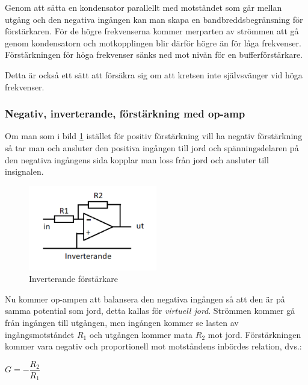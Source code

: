 Genom att sätta en kondensator parallellt med motståndet som går mellan utgång
och den negativa ingången kan man skapa en bandbreddsbegränsning för
förstärkaren.
För de högre frekvenserna kommer merparten av strömmen att gå genom
kondensatorn och motkopplingen blir därför högre än för låga frekvenser.
Förstärkningen för höga frekvenser sänks ned mot nivån för en bufferförstärkare.

Detta är också ett sätt att försäkra sig om att kretsen inte självsvänger vid
höga frekvenser.

\subsubsection{Negativ, inverterande, förstärkning med op-amp}
\label{inverterande förstärkning}
\label{virtuell jord}
\label{jordning!virtuell}

Om man som i bild \ref{fig:BildII2-47} istället för positiv förstärkning vill
ha negativ förstärkning så tar man och ansluter den positiva ingången till jord
och spänningsdelaren på den negativa ingångens sida kopplar man loss från jord
och ansluter till insignalen.

\begin{figure}
	\includegraphics[width=0.5\textwidth]{images/cropped_pdfs/bild_2_2-47.pdf}
	\caption{Inverterande förstärkare}
	\label{fig:BildII2-47}
\end{figure}

Nu kommer op-ampen att balansera den negativa ingången så att den är på samma
potential som jord, detta kallas för \emph{virtuell jord}.
Strömmen kommer gå från ingången till utgången, men ingången kommer se lasten
av ingångsmotståndet \(R_1\) och utgången kommer mata \(R_2\) mot jord.
Förstärkningen kommer vara negativ och proportionell mot motståndens inbördes
relation, dvs.:

\(G = -\dfrac{R_2}{R_1}\)
